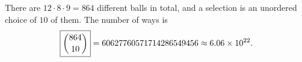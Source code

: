 There are $12\cdot8\cdot9=864$ different balls in total, and a selection is an unordered choice of $10$ of them. The number of ways is
\[
\boxed{\dbinom{864}{10}}=60627760571714286549456\approx6.06\times10^{22}.
\]
